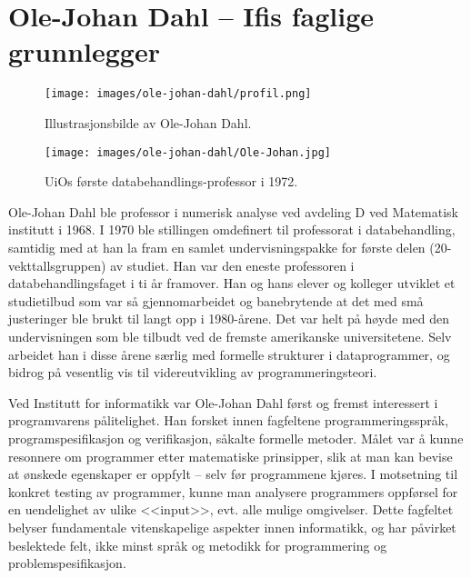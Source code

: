\chapter[Ole-Johan Dahl]{Ole-Johan Dahl – Ifis faglige grunnlegger}

\author{Skrevet av Narve Trædal}

\begin{wrapfigure}{r}{6cm}
	\centering
	\texttt{[image: images/ole-johan-dahl/profil.png]}
	\label{fig:ole-johan-dahl}
	\caption{Illustrasjonsbilde av Ole-Johan Dahl.}
\end{wrapfigure}

\begin{figure}[h!]
	\texttt{[image: images/ole-johan-dahl/Ole-Johan.jpg]}
	\label{fig:ole-johan}
	\caption{UiOs første databehandlings-professor i 1972.}
\end{figure}

Ole-Johan Dahl ble professor i numerisk analyse ved avdeling D ved Matematisk institutt i 1968. I 1970 ble stillingen omdefinert til professorat i databehandling, samtidig med at han la fram en samlet undervisningspakke for første delen (20-vekttallsgruppen) av studiet. Han var den eneste professoren i databehandlingsfaget i ti år framover. Han og hans elever og kolleger utviklet et studietilbud som var så gjennomarbeidet og banebrytende at det med små justeringer ble brukt til langt opp i 1980-årene. Det var helt på høyde med den undervisningen som ble tilbudt ved de fremste amerikanske universitetene. Selv arbeidet han i disse årene særlig med formelle strukturer i dataprogrammer, og bidrog på vesentlig vis til videreutvikling av programmeringsteori.

Ved Institutt for informatikk var Ole-Johan Dahl først og fremst interessert i programvarens pålitelighet. Han forsket innen fagfeltene programmeringsspråk, programspesifikasjon og verifikasjon, såkalte formelle metoder. Målet var å kunne resonnere om programmer etter matematiske prinsipper, slik at man kan bevise at ønskede egenskaper er oppfylt – selv før programmene kjøres. I motsetning til konkret testing av programmer, kunne man analysere programmers oppførsel for en uendelighet av ulike <<input>>, evt. alle mulige omgivelser. Dette fagfeltet belyser fundamentale vitenskapelige aspekter innen informatikk, og har påvirket beslektede felt, ikke minst språk og metodikk for programmering og problemspesifikasjon.

